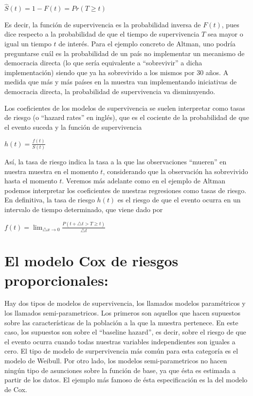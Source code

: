 \documentclass[]{book}
\begin{document}
\(\hat S(t)= 1-F(t)=Pr(T\geq t)\)

Es decir, la función de supervivencia es la probabilidad inversa de
\(F(t)\), pues dice respecto a la probabilidad de que el tiempo de
supervivencia \(T\) sea mayor o igual un tiempo \(t\) de interés. Para
el ejemplo concreto de Altman, uno podría preguntarse cuál es la
probabilidad de un país no implementar un mecanismo de democracia
directa (lo que sería equivalente a ``sobrevivir'' a dicha
implementación) siendo que ya ha sobrevivido a los mismos por 30 años. A
medida que más y más países en la muestra van implementando iniciativas
de democracia directa, la probabilidad de supervivencia va disminuyendo.

Los coeficientes de los modelos de supervivencia se suelen interpretar
como tasas de riesgo (o ``hazard rates'' en inglés), que es el cociente
de la probabilidad de que el evento suceda y la función de supervivencia

\(h(t)=\frac{f(t)}{S(t)}\)

Así, la tasa de riesgo indica la tasa a la que las observaciones
``mueren'' en nuestra muestra en el momento \(t\), considerando que la
observación ha sobrevivido hasta el momento \(t\). Veremos más adelante
como en el ejemplo de Altman podemos interpretar los coeficientes de
nuestras regresiones como tasas de riesgo. En definitiva, la tasa de
riesgo \(h(t)\) es el riesgo de que el evento ocurra en un intervalo de
tiempo determinado, que viene dado por

\(f(t)=\lim_{\bigtriangleup x \to 0} \frac {P(t+\bigtriangleup t > T \geq t)}{\bigtriangleup t}\)

\hypertarget{el-modelo-cox-de-riesgos-proporcionales}{%
\section{El modelo Cox de riesgos
proporcionales:}\label{el-modelo-cox-de-riesgos-proporcionales}}

Hay dos tipos de modelos de supervivencia, los llamados modelos
paramétricos y los llamados semi-parametricos. Los primeros son aquellos
que hacen supuestos sobre las características de la población a la que
la muestra pertenece. En este caso, los supuestos son sobre el
``baseline hazard'', es decir, sobre el riesgo de que el evento ocurra
cuando todas nuestras variables independientes son iguales a cero. El
tipo de modelo de surpervivencia más común para esta categoría es el
modelo de Weibull. Por otro lado, los modelos semi-parametricos no hacen
ningún tipo de asunciones sobre la función de base, ya que ésta es
estimada a partir de los datos. El ejemplo más famoso de ésta
especificación es la del modelo de Cox.
\end{document}
